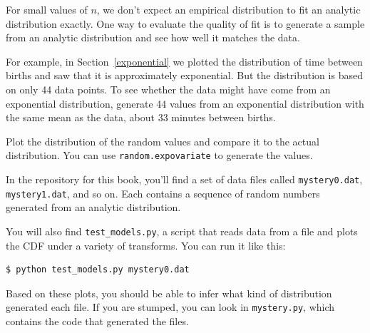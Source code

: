 \documentclass[12pt]{book}
\begin{document}
\begin{exercise}
For small values of $n$, we don't expect an empirical distribution
to fit an analytic distribution exactly.  One way to evaluate
the quality of fit is to generate a sample from an analytic
distribution and see how well it matches the data.

For example, in Section~\ref{exponential} we plotted the distribution
of time between births and saw that it is approximately exponential.
But the distribution is based on only 44 data points.  To see whether
the data might have come from an exponential distribution, generate 44
values from an exponential distribution with the same mean as the
data, about 33 minutes between births.

Plot the distribution of the random values and compare it to the
actual distribution.  You can use {\tt random.expovariate} 
to generate the values.

\end{exercise}

\begin{exercise}
In the repository for this book, you'll find a set of data files
called {\tt mystery0.dat}, {\tt mystery1.dat}, and so on.  Each
contains a sequence of random numbers generated from an analytic
distribution.

You will also find \verb"test_models.py", a script that reads
data from a file and plots the CDF under a variety of transforms.
You can run it like this:

\begin{verbatim}
$ python test_models.py mystery0.dat
\end{verbatim}

Based on these plots, you should be able to infer what kind of
distribution generated each file.  If you are stumped, you can
look in {\tt mystery.py}, which contains the code that generated
the files.

\end{exercise}
\end{document}
